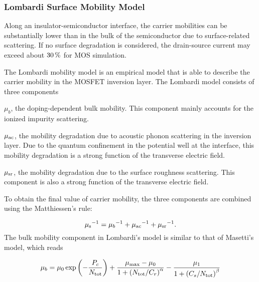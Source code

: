 \documentclass[oneside,12pt]{cgd_book}
\begin{document}
\subsubsection{Lombardi Surface Mobility Model}
\label{sec:Equation:Mobility:Unified:Lombardi}
Along an insulator-semiconductor interface, the carrier mobilities can be substantially lower
          than in the bulk of the semiconductor due to surface-related scattering. If no surface degradation is
          considered, the drain-source current may exceed about
$30\text{\,\%}$ for MOS
          simulation.
\par
The Lombardi mobility model \cite[Lombardi1988]{} is an empirical model that is able to
          describe the carrier mobility in the MOSFET inversion layer. The Lombardi model consists of three
          components
\par
\begin{compactitem}
\item $\mu_b$, the doping-dependent bulk mobility. This component mainly
                accounts for the ionized impurity scattering.
\par
\item $\mu_{\rm ac}$, the mobility degradation due to acoustic phonon
                scattering in the inversion layer. Due to the quantum confinement in the potential well at the
                interface, this mobility degradation is a strong function of the transverse electric field.
\par
\item $\mu_{\rm sr}$, the mobility degradation due to the surface roughness
                scattering. This component is also a strong function of the transverse electric field.
\par
\end{compactitem}
To obtain the final value of carrier mobility, the three components are combined using the
          Matthiessen's rule:
\par
\begin{equation}
{\mu_{\rm s}}^{ - 1} = {\mu_b}^{-1} + {\mu _{\rm ac}}^{ - 1} + {\mu _{\rm
            sr}}^{-1}.
\end{equation}
The bulk mobility component in Lombardi's model is similar to that of Masetti's model, which
            reads
\par
\par
\begin{equation}
\mu_b = \mu_0 \exp\left( -\frac{P_c} {N_{\rm tot}} \right) + \frac{\mu_{\rm max} -
            \mu_0}{1+\left( N_{\rm tot}/C_r \right)^\alpha } - \frac{\mu_1}{1 + \left( C_s/N_{\rm tot} \right)^\beta
            }
\end{equation}
\end{document}
